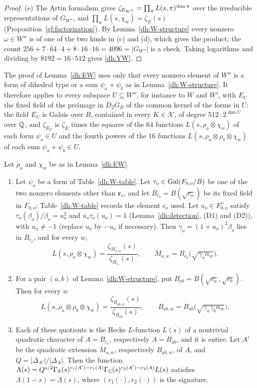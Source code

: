\begin{proof}
(e) The Artin formalism gives $\zeta_{E_{W''}}=\prod_\pi L(s,\pi)^{\dim\pi}$ over
the irreducible representations of $G_{W''}$, and $\prod_wL(s,\chi_w)=
\zeta_E(s)$ (Proposition~\ref{gf:factorization}). By Lemma~\ref{dh:W-structure} every nonzero $\omega\in W''$ is
of one of the two kinds in (c) and (d), which gives the product; the count
$256+7\cdot64\cdot4+8\cdot16\cdot16=4096=|G_{W''}|$ is a check. Taking
logarithms and dividing by $8192=16\cdot512$ gives \eqref{dh:YW}.
\end{proof}

\begin{remark}\label{dh:EW-sub}
The proof of Lemma~\ref{dh:EW} uses only that every nonzero element of
$W''$ is a form of dihedral type or a sum $\psi_a+\psi_b$ as in
Lemma~\ref{dh:W-structure}. It therefore applies to every subspace
$U\subseteq W''$, for instance to $W$ and $W'$, with $E_U$ the fixed field of
the preimage in $D_2G_B$ of the common kernel of the forms in $U$: the field
$E_U$ is Galois over $B$, contained in every $K\in\mathcal K$, of degree
$512\cdot2^{\dim U}$ over $\mathbb Q$, and $\zeta_{E_U}$ is $\zeta_E$ times the
squares of the $64$ functions $L(s,\rho_o\otimes\chi_w)$ of each form
$\psi_o\in U$ and the fourth powers of the $16$ functions
$L(s,\rho_a\otimes\rho_b\otimes\chi_w)$ of each sum $\psi_a+\psi_b\in U$.
\end{remark}

\begin{lemma}\label{dh:Lfunctions}
Let $\rho_o$ and $\chi_w$ be as in Lemma~\ref{dh:EW}.
\begin{enumerate}
\item[(a)] Let $\psi_o$ be a form of Table~\ref{dh:W-table}. Let
 $\tau_o\in\operatorname{Gal}(F_{0,o}/B)$ be one of the two nonzero elements other than
 $\mathbf r_o$, and let $B_{c_o}=B(\sqrt{c_o})$ be its fixed field in
 $F_{0,o}$; Table~\ref{dh:W-table} records the element $c_o$ used. Let
 $u_o\in F_{0,o}^\times$ satisfy $\tau_o(\beta_o)/\beta_o=u_o^2$ and
 $u_o\tau_o(u_o)=1$ (Lemma~\ref{dh:detection}, (D1) and (D2)), with
 $u_o\ne-1$ (replace $u_o$ by $-u_o$ if necessary). Then
 $\gamma_o=(1+u_o)^2\beta_o$ lies in $B_{c_o}$, and for every $w$,
 \[
  L(s,\rho_o\otimes\chi_w)=\frac{\zeta_{M_{o,w}}(s)}{\zeta_{B_{c_o}}(s)},\qquad
  M_{o,w}=B_{c_o}\bigl(\sqrt{\gamma_o\alpha_w}\bigr).
 \]
\item[(b)] For a pair $(a,b)$ of Lemma~\ref{dh:W-structure}, put
 $B_{ab}=B(\sqrt{c_a},\sqrt{c_b})$. Then for every $w$
 \[
  L(s,\rho_a\otimes\rho_b\otimes\chi_w)
  =\frac{\zeta_{B_{ab,w}}(s)}{\zeta_{B_{ab}}(s)},
  \qquad B_{ab,w}=B_{ab}\bigl(\sqrt{\gamma_a\gamma_b\alpha_w}\bigr).
 \]
\item[(c)] Each of these quotients is the Hecke $L$-function $L(s)$ of a
 nontrivial quadratic character of $A=B_{c_o}$, respectively $A=B_{ab}$, and
 it is entire. Let $A'$ be the quadratic extension $M_{o,w}$, respectively
 $B_{ab,w}$, of $A$, and $Q=|\Delta_{A'}|/|\Delta_A|$. Then the function
 $\Lambda(s)=Q^{s/2}\Gamma_\mathbb R(s)^{r_1(A')-r_1(A)}\Gamma_\mathbb C(s)^{r_2(A')-r_2(A)}L(s)$
 satisfies $\Lambda(1-s)=\Lambda(s)$, where $(r_1(\cdot),r_2(\cdot))$ is the
 signature.
\end{enumerate}
\end{lemma}

